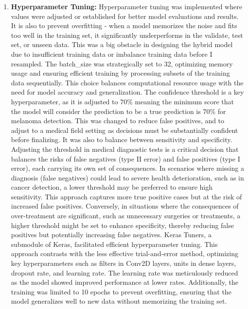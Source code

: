 \documentclass[10pt,twocolumn]{article}
\begin{document}
\begin{enumerate}
    \newline
    \item \textbf {Hyperparameter Tuning:} Hyperparameter tuning was implemented where values were adjusted or established for better model evaluations and results. It is also to prevent overfitting - when a model memorizes the noise and fits too well in the training set, it significantly underperforms in the validate, test set, or unseen data. This was a big obstacle in designing the hybrid model due to insufficient training data or imbalance training data before I resampled. The batch\_size was strategically set to 32, optimizing memory usage and ensuring efficient training by processing subsets of the training data sequentially. This choice balances computational resource usage with the need for model accuracy and generalization. \newline The confidence threshold is a key hyperparameter, as it is adjusted to 70\% meaning the minimum score that the model will consider the prediction to be a true prediction is 70\% for melanoma detection. This was changed to reduce false positives, and to adjust to a medical field setting as decisions must be substantially confident before finalizing. It was also to balance between sensitivity and specificity. Adjusting the threshold in medical diagnostic tests is a critical decision that balances the risks of false negatives (type II error) and false positives (type I error), each carrying its own set of consequences. In scenarios where missing a diagnosis (false negatives) could lead to severe health deterioration, such as in cancer detection, a lower threshold may be preferred to ensure high sensitivity. This approach captures more true positive cases but at the risk of increased false positives. Conversely, in situations where the consequences of over-treatment are significant, such as unnecessary surgeries or treatments, a higher threshold might be set to enhance specificity, thereby reducing false positives but potentially increasing false negatives. \newline
    Keras Tuners, a submodule of Keras, facilitated efficient hyperparameter tuning. This approach contrasts with the less effective trial-and-error method, optimizing key hyperparameters such as filters in Conv2D layers, units in dense layers, dropout rate, and learning rate. The learning rate was meticulously reduced as the model showed improved performance at lower rates. Additionally, the training was limited to 10 epochs to prevent overfitting, ensuring that the model generalizes well to new data without memorizing the training set. \newline 

\end{enumerate}
\end{document}
